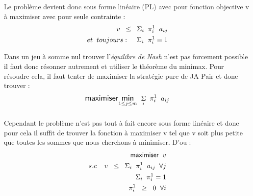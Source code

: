 \documentclass[a4paper, 12pt, twoside]{article}
\begin{document}
{Le problème devient donc sous forme linéaire (PL) avec pour fonction objective \textsf{v} à maximiser avec pour seule contrainte : 
\begin{align*}
\large{v \hspace{0.2 cm} \leq  \hspace{0.2 cm}\Sigma_{i}\hspace{0.2 cm} \pi_{i}^{1}\hspace{0.2 cm} a _{ij}} \\ et \hspace{0,2 cm} toujours : \hspace{0,4 cm}
\large{\Sigma_{i} \hspace{0.2 cm} \pi_{i}^{1} = 1}
\end{align*}{Dans un jeu à somme nul trouver l'\textit{équilibre de Nash} n'est pas forcement possible il faut donc résonner autrement et utiliser le théorème du \textsf{minimax}. Pour résoudre cela, il faut tenter de maximiser la stratégie pure de \textsf{JA} \textsf{Pair} et donc trouver : \newline
\begin{align*}
 \large {\textsf{maximiser} \underset{1 \leq j \leq m}{\textsf{min}} \hspace{0,2cm}  \underset{i}{\Sigma} \hspace{0,2cm} \pi_{i}^{1} \hspace{0,2cm}  a _{ij} }  
\end{align*}
\subparagraph*{}{Cependant le problème n'est pas tout à fait encore sous forme linéaire et donc pour cela il suffit de trouver la fonction à maximiser \textsf{v} tel que \textsf{v} soit plus petite  que toutes les sommes que nous cherchons à minimiser. D'ou :} 
\begin{align*}
\textsf{maximiser} \hspace{0,2 cm} v \\ 
 s.c \hspace{0.4 cm} v \hspace{0,2 cm} \leq  \hspace{0.2 cm}\Sigma_{i}\hspace{0.2 cm} \pi_{i}^{1}\hspace{0.2 cm} a _{ij} \hspace{0,2 cm} \forall j\\
\Sigma_{i} \hspace{0.2 cm} \pi_{i}^{1} = 1 \\ 
\pi_{i}^{1} \hspace{0,2 cm} \geq \hspace{0,2 cm} 0 \hspace{0,2 cm} \forall i 
\end{align*}





}}
\end{document}
